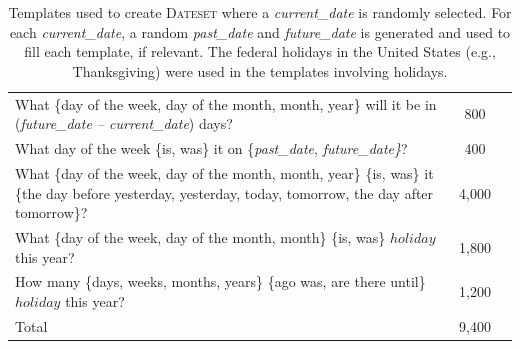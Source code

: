 \documentclass[11pt]{article}
\begin{document}
\begin{CJK*}{UTF8}{gbsn}
\begin{table}
\begin{tabularx}{\linewidth}{Xcc}
         What \{day of the week, day of the month, month, year\} will it be in (\textit{future\_date -- current\_date}) days?  & \phantom{00,}800\\
        What day of the week \{is, was\} it on \{\textit{past\_date}, \textit{future\_date\}}? & \phantom{00,}400\\ 
        What \{day of the week, day of the month, month, year\} \{is, was\} it \{the day before yesterday, yesterday, today, tomorrow, the day after tomorrow\}? & \phantom{0}4,000\\
        What \{day of the week, day of the month, month\} \{is, was\} $holiday$ this year? & \phantom{0}1,800\\
        How many \{days, weeks, months, years\} \{ago was, are there until\} $holiday$ this year?  & \phantom{0}1,200\\
        \midrule
        Total & \phantom{0}9,400 \\
         \bottomrule
    \end{tabularx}
    \caption{Templates used to create \textsc{Dateset} where a \textit{current\_date} is randomly selected. For each \textit{current\_date}, a random \textit{past\_date} and \textit{future\_date} is generated and used to fill each template, if relevant. The federal holidays in the United States (e.g., Thanksgiving) were used in the templates involving holidays.}
    \label{tab:dateset_stats}
\end{table}

\end{CJK*}
\end{document}
